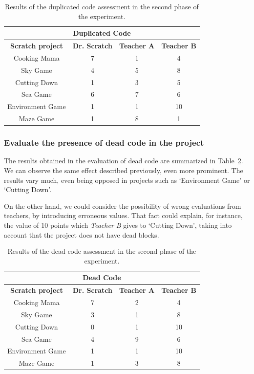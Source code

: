 \begin{table}
    \centering
    \begin{tabular}{|c|c|c|c|}
        \hline
        \multicolumn{4}{|c|}{\textbf{Duplicated Code}} \\ \hline
        \textbf{Scratch project} & \textbf{Dr. Scratch} & \textbf{Teacher A} & \textbf{Teacher B} \\ \hline
        Cooking Mama  & 7 & 1 & 4  \\ \hline
        Sky Game & 4 & 5 & 8 \\ \hline
        Cutting Down  & 1 & 3 & 5  \\ \hline
        Sea Game  & 6 & 7 & 6  \\ \hline
        Environment Game  & 1 & 1 & 10  \\ \hline
        Maze Game  & 1 & 8 & 1  \\ \hline
    \end{tabular}
    \caption{Results of the duplicated code assessment in the second phase of the experiment.}
    \label{table:assessment_experiment_dup_code}
\end{table}


\subsubsection{Evaluate the presence of dead code in the project}
\label{subsubsec:dead_code_experiment}

The results obtained in the evaluation of dead code are summarized in Table~\ref{table:assessment_experiment_dead_code}. We can observe the same effect described previously, even more prominent. The results vary much, even being opposed in projects such as `Environment Game' or `Cutting Down'. 

On the other hand, we could consider the possibility of wrong evaluations from teachers, by introducing erroneous values. That fact could explain, for instance, the value of 10 points which \textit{Teacher B} gives to `Cutting Down', taking into account that the project does not have dead blocks. 


\begin{table}
    \centering
    \begin{tabular}{|c|c|c|c|}
        \hline
        \multicolumn{4}{|c|}{\textbf{Dead Code}} \\ \hline
        \textbf{Scratch project} & \textbf{Dr. Scratch} & \textbf{Teacher A} & \textbf{Teacher B} \\ \hline
        Cooking Mama  & 7 & 2 & 4  \\ \hline
        Sky Game & 3 & 1 & 8 \\ \hline
        Cutting Down  & 0 & 1 & 10  \\ \hline
        Sea Game  & 4 & 9 & 6  \\ \hline
        Environment Game  & 1 & 1 & 10  \\ \hline
        Maze Game  & 1 & 3 & 8  \\ \hline
    \end{tabular}
    \caption{Results of the dead code assessment in the second phase of the experiment.}
    \label{table:assessment_experiment_dead_code}
\end{table}

